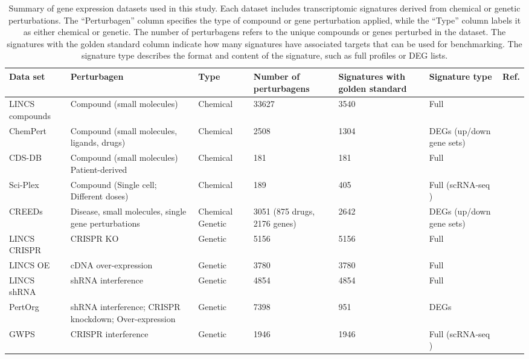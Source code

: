 \begin{longtable}[c]{lllllll}
\caption{Summary of gene expression datasets used in this study. Each dataset includes transcriptomic signatures derived from chemical or genetic perturbations. The “Perturbagen” column specifies the type of compound or gene perturbation applied, while the “Type” column labels it as either chemical or genetic. The number of perturbagens refers to the unique compounds or genes perturbed in the dataset. The signatures with the golden standard column indicate how many signatures have associated targets that can be used for benchmarking. The signature type describes the format and content of the signature, such as full profiles or DEG lists.}
\label{tab:gene_expression_datasets} \\

\textbf{Data set} &
  \textbf{Perturbagen} &
  \textbf{Type} &
  \textbf{Number of perturbagens} &
  \textbf{Signatures with golden standard} &
  \textbf{Signature type} &
  \textbf{Ref.} \\
\endfirsthead
%
\endhead
%
LINCS compounds & Compound (small molecules)                            & Chemical & 33627 & 3540 & Full              & ~\cite{RN30} \\
ChemPert &
  Compound (small molecules, ligands, drugs) &
  Chemical &
  2508 &
  1304 &
  DEGs (up/down gene sets) &
  ~\cite{RN86} \\
CDS-DB          & Compound (small molecules) Patient-derived            & Chemical & 181   & 181  & Full              & ~\cite{RN84} \\
Sci-Plex        & Compound (Single cell; Different doses)               & Chemical & 189   & 405  & Full (scRNA-seq ) & ~\cite{RN88} \\
CREEDs &
  Disease, small molecules, single gene perturbations &
  Chemical Genetic &
  3051 (875 drugs, 2176 genes) &
  2642 &
  DEGs (up/down gene sets) &
  ~\cite{RN87} \\
LINCS CRISPR    & CRISPR KO                                             & Genetic  & 5156  & 5156 & Full              & ~\cite{RN30} \\
LINCS OE        & cDNA over-expression                                  & Genetic  & 3780  & 3780 & Full              & ~\cite{RN30} \\
LINCS shRNA     & shRNA interference                                    & Genetic  & 4854  & 4854 & Full              & ~\cite{RN30} \\
PertOrg         & shRNA interference; CRISPR knockdown; Over-expression & Genetic  & 7398  & 951  & DEGs              & ~\cite{RN85} \\
GWPS            & CRISPR interference                                   & Genetic  & 1946  & 1946 & Full (scRNA-seq ) & ~\cite{RN89}
\end{longtable}

